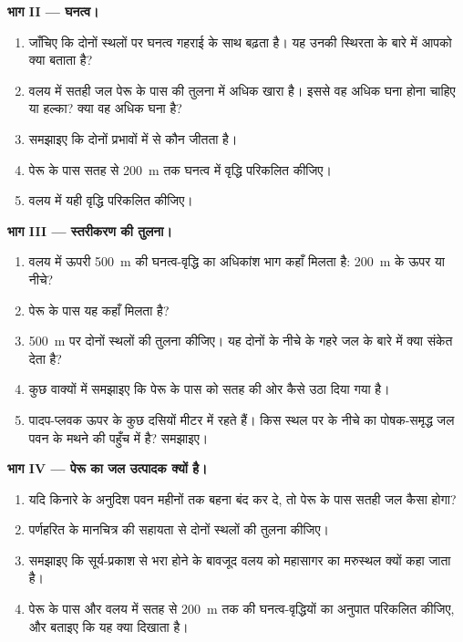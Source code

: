 \begin{problem}[{सप्ताहांत समस्या --- दक्षिण प्रशांत के दो प्रोफ़ाइल}]
\medskip
\noindent\textbf{भाग II --- घनत्व।}
\begin{enumerate}[resume]
  \item जाँचिए कि दोनों स्थलों पर घनत्व गहराई के साथ बढ़ता है। यह
        उनकी स्थिरता के बारे में आपको क्या बताता है?
  \item वलय में सतही जल पेरू के पास की तुलना में अधिक खारा है। इससे वह
        अधिक घना होना चाहिए या हल्का? क्या वह अधिक घना है?
  \item समझाइए कि दोनों प्रभावों में से कौन जीतता है।
  \item पेरू के पास सतह से \qty{200}{m} तक घनत्व में वृद्धि
        परिकलित कीजिए।
  \item वलय में यही वृद्धि परिकलित कीजिए।
\end{enumerate}

\medskip
\noindent\textbf{भाग III --- स्तरीकरण की तुलना।}
\begin{enumerate}[resume]
  \item वलय में ऊपरी \qty{500}{m} की घनत्व-वृद्धि का अधिकांश भाग कहाँ
        मिलता है: \qty{200}{m} के ऊपर या नीचे?
  \item पेरू के पास यह कहाँ मिलता है?
  \item \qty{500}{m} पर दोनों स्थलों की तुलना कीजिए। यह दोनों के नीचे के गहरे जल
        के बारे में क्या संकेत देता है?
  \item कुछ वाक्यों में समझाइए कि पेरू के पास  को सतह की ओर
        कैसे उठा दिया गया है।
  \item पादप-प्लवक ऊपर के कुछ दसियों मीटर में रहते हैं। किस स्थल पर
         के नीचे का पोषक-समृद्ध जल पवन के मथने की
        पहुँच में है? समझाइए।
\end{enumerate}

\medskip
\noindent\textbf{भाग IV --- पेरू का जल उत्पादक क्यों है।}
\begin{enumerate}[resume]
  \item यदि किनारे के अनुदिश पवन महीनों तक बहना बंद कर दे, तो पेरू के पास सतही जल
        कैसा होगा?
  \item पर्णहरित के मानचित्र की सहायता से दोनों स्थलों की तुलना कीजिए।
  \item समझाइए कि सूर्य-प्रकाश से भरा होने के बावजूद वलय को महासागर का
        मरुस्थल क्यों कहा जाता है।
  \item पेरू के पास और वलय में सतह से \qty{200}{m} तक की घनत्व-वृद्धियों का
        अनुपात परिकलित कीजिए, और बताइए कि यह क्या दिखाता है।
\end{enumerate}
\end{problem}
